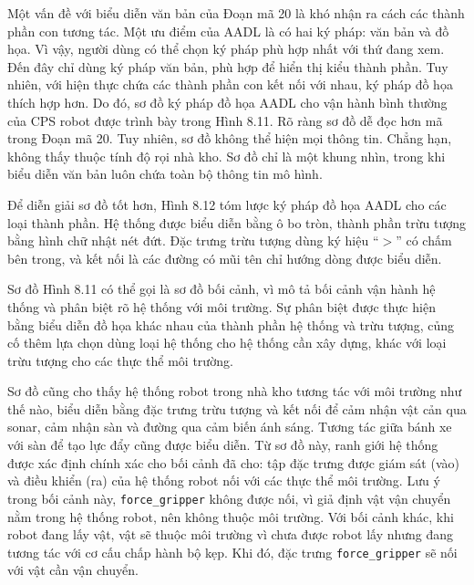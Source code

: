 Một vấn đề với biểu diễn văn bản của Đoạn mã 20 là khó nhận ra cách các thành phần con tương tác. Một ưu điểm của AADL là có hai ký pháp: văn bản và đồ họa. Vì vậy, người dùng có thể chọn ký pháp phù hợp nhất với thứ đang xem. Đến đây chỉ dùng ký pháp văn bản, phù hợp để hiển thị kiểu thành phần. Tuy nhiên, với hiện thực chứa các thành phần con kết nối với nhau, ký pháp đồ họa thích hợp hơn. Do đó, sơ đồ ký pháp đồ họa AADL cho vận hành bình thường của CPS robot được trình bày trong Hình 8.11. Rõ ràng sơ đồ dễ đọc hơn mã trong Đoạn mã 20. Tuy nhiên, sơ đồ không thể hiện mọi thông tin. Chẳng hạn, không thấy thuộc tính độ rọi nhà kho. Sơ đồ chỉ là một khung nhìn, trong khi biểu diễn văn bản luôn chứa toàn bộ thông tin mô hình.

Để diễn giải sơ đồ tốt hơn, Hình 8.12 tóm lược ký pháp đồ họa AADL cho các loại thành phần. Hệ thống được biểu diễn bằng ô bo tròn, thành phần trừu tượng bằng hình chữ nhật nét đứt. Đặc trưng trừu tượng dùng ký hiệu ``$>$'' có chấm bên trong, và kết nối là các đường có mũi tên chỉ hướng dòng được biểu diễn.

Sơ đồ Hình 8.11 có thể gọi là sơ đồ bối cảnh, vì mô tả bối cảnh vận hành hệ thống và phân biệt rõ hệ thống với môi trường. Sự phân biệt được thực hiện bằng biểu diễn đồ họa khác nhau của thành phần hệ thống và trừu tượng, củng cố thêm lựa chọn dùng loại hệ thống cho hệ thống cần xây dựng, khác với loại trừu tượng cho các thực thể môi trường.

Sơ đồ cũng cho thấy hệ thống robot trong nhà kho tương tác với môi trường như thế nào, biểu diễn bằng đặc trưng trừu tượng và kết nối để cảm nhận vật cản qua sonar, cảm nhận sàn và đường qua cảm biến ánh sáng. Tương tác giữa bánh xe với sàn để tạo lực đẩy cũng được biểu diễn. Từ sơ đồ này, ranh giới hệ thống được xác định chính xác cho bối cảnh đã cho: tập đặc trưng được giám sát (vào) và điều khiển (ra) của hệ thống robot nối với các thực thể
môi trường. Lưu ý trong bối cảnh này, \texttt{force\_gripper} không được nối, vì giả định vật vận chuyển nằm trong hệ thống robot, nên không thuộc môi trường. Với bối cảnh khác, khi robot đang lấy vật, vật sẽ thuộc môi trường vì chưa được robot lấy nhưng đang tương tác với cơ cấu chấp hành bộ kẹp. Khi đó, đặc trưng \texttt{force\_gripper} sẽ nối với vật cần vận chuyển.

